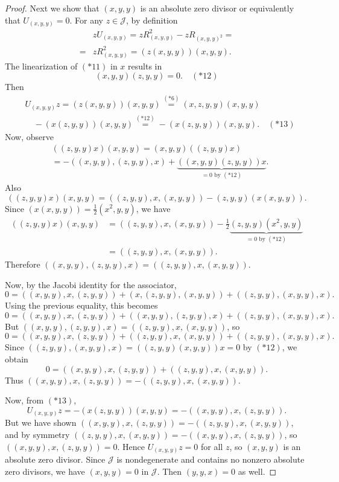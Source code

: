 \documentclass{article}
\begin{document}
\begin{proof}
Next we show that $(x,y,y)$ is an absolute zero divisor or equivalently that $U_{(x,y,y)}=0$. For any $z \in \mathcal{J}$, by definition
\[
\begin{aligned}
& zU_{(x,y,y)}=zR_{(x,y,y)}^2-zR_{(x,y,y)^2}= \\
=& zR_{(x,y,y)}^2=(z(x,y,y))(x,y,y).
\end{aligned}
\]
The linearization of $(*11)$ in $x$ results in
\[
(x,y,y)(z,y,y)=0. \quad (*12)
\]
Then
\[
\begin{aligned}
& U_{(x,y,y)}z=(z(x,y,y))(x,y,y) \stackrel{(*6)}{=} (x,z,y,y)(x,y,y) \\
& \quad - (x(z,y,y))(x,y,y) \stackrel{(*12)}{=} - (x(z,y,y))(x,y,y). \quad (*13)
\end{aligned}
\]
Now, observe
\[
\begin{aligned}
& ((z,y,y)x)(x,y,y)=(x,y,y)((z,y,y)x) \\
& = -((x,y,y),(z,y,y),x)+\underbrace{((x,y,y)(z,y,y))x}_{=0 \text{ by } (*12)}.
\end{aligned}
\]
Also
\[
((z,y,y)x)(x,y,y)=((z,y,y),x,(x,y,y))-(z,y,y)(x(x,y,y)).
\]
Since $(x(x,y,y))=\frac{1}{2}(x^2,y,y)$, we have
\[
\begin{aligned}
((z,y,y)x)(x,y,y)&=((z,y,y),x,(x,y,y))-\frac{1}{2}\underbrace{(z,y,y)(x^2,y,y)}_{=0 \text{ by } (*12)} \\
&=((z,y,y),x,(x,y,y)).
\end{aligned}
\]
Therefore $((x,y,y),(z,y,y),x)=((z,y,y),x,(x,y,y))$.

Now, by the Jacobi identity for the associator,
\[
0=((x,y,y),x,(z,y,y))+(x,(z,y,y),(x,y,y))+((z,y,y),(x,y,y),x).
\]
Using the previous equality, this becomes
\[
0=((x,y,y),x,(z,y,y))+((x,y,y),(z,y,y),x)+((z,y,y),(x,y,y),x).
\]
But $((x,y,y),(z,y,y),x)=((z,y,y),x,(x,y,y))$, so
\[
0=((x,y,y),x,(z,y,y))+((z,y,y),x,(x,y,y))+((z,y,y),(x,y,y),x).
\]
Since $((z,y,y),(x,y,y),x)=((z,y,y)(x,y,y))x=0$ by $(*12)$, we obtain
\[
0=((x,y,y),x,(z,y,y))+((z,y,y),x,(x,y,y)).
\]
Thus $((x,y,y),x,(z,y,y))=-((z,y,y),x,(x,y,y))$.

Now, from $(*13)$,
\[
U_{(x,y,y)}z = - (x(z,y,y))(x,y,y) = -((x,y,y),x,(z,y,y)).
\]
But we have shown $((x,y,y),x,(z,y,y)) = -((z,y,y),x,(x,y,y))$, and by symmetry $((z,y,y),x,(x,y,y)) = -((x,y,y),x,(z,y,y))$, so $((x,y,y),x,(z,y,y))=0$. Hence $U_{(x,y,y)}z=0$ for all $z$, so $(x,y,y)$ is an absolute zero divisor. Since $\mathcal{J}$ is nondegenerate and contains no nonzero absolute zero divisors, we have $(x,y,y)=0$ in $\mathcal{J}$. Then $(y,y,x)=0$ as well.


\end{proof}
\end{document}
